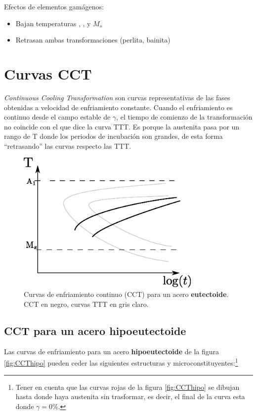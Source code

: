 Efectos de elementos gamágenos:
\begin{itemize}
    \item Bajan temperaturas \Aone, \Athree, \Bs y $M_s$
    \item Retrasan ambas transformaciones (perlita, bainita)
\end{itemize}

\section{Curvas CCT}
\textit{Continuous Cooling Transformation} son curvas representativas de las fases obtenidas a velocidad de enfriamiento constante. Cuando el enfriamiento es continuo desde el campo estable de $\gamma$, el tiempo de comienzo de la transformación no coincide con el que dice la curva TTT. Es porque la austenita pasa por un rango de T donde los periodos de incubación son grandes, de esta forma ``retrasando'' las curvas respecto las TTT.

\begin{figure}[htb!]
    \centering
    \includegraphics[width=0.8\textwidth]{fig/CCTeutect.eps}
    \caption{Curvas de enfriamiento continuo (CCT) para un acero \textbf{eutectoide}. CCT en negro, curvas TTT en gris claro.}
    \label{fig:CCTeutect}
\end{figure}

\subsection{CCT para un acero hipoeutectoide}
Las curvas de enfriamiento para un acero \textbf{hipoeutectoide} de la figura \ref{fig:CCThipo} pueden ceder las siguientes estructuras y microconstituyentes:\footnote{Tener en cuenta que las curvas rojas de la figura \ref{fig:CCThipo} se dibujan hasta donde haya austenita sin trasformar, es decir, el final de la curva esta donde $\gamma=0\%$.}


